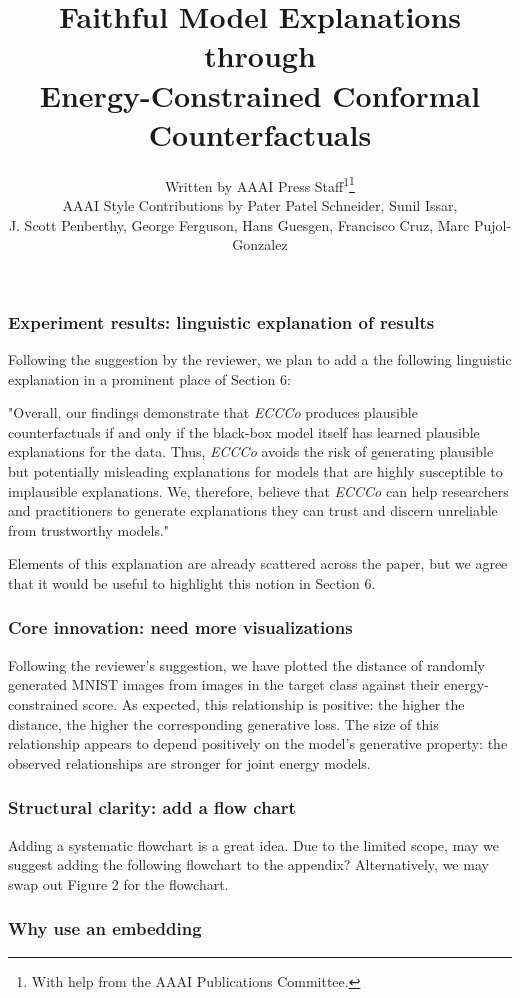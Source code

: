 \documentclass[letterpaper]{article} %
\title{Faithful Model Explanations through\\
Energy-Constrained Conformal Counterfactuals}
\author{
    Written by AAAI Press Staff\textsuperscript{\rm 1}\thanks{With help from the AAAI Publications Committee.}\\
    AAAI Style Contributions by Pater Patel Schneider,
    Sunil Issar,\\
    J. Scott Penberthy,
    George Ferguson,
    Hans Guesgen,
    Francisco Cruz\equalcontrib,
    Marc Pujol-Gonzalez\equalcontrib
}
\begin{document}
\subsubsection{Experiment results: linguistic explanation of results} 

Following the suggestion by the reviewer, we plan to add a the following linguistic explanation in a prominent place of Section 6: 

"Overall, our findings demonstrate that \textit{ECCCo} produces plausible counterfactuals if and only if the black-box model itself has learned plausible explanations for the data. Thus, \textit{ECCCo} avoids the risk of generating plausible but potentially misleading explanations for models that are highly susceptible to implausible explanations. We, therefore, believe that \textit{ECCCo} can help researchers and practitioners to generate explanations they can trust and discern unreliable from trustworthy models."

Elements of this explanation are already scattered across the paper, but we agree that it would be useful to highlight this notion in Section 6.

\subsubsection{Core innovation: need more visualizations} 

Following the reviewer's suggestion, we have plotted the distance of randomly generated MNIST images from images in the target class against their energy-constrained score. As expected, this relationship is positive: the higher the distance, the higher the corresponding generative loss. The size of this relationship appears to depend positively on the model's generative property: the observed relationships are stronger for joint energy models. 

\subsubsection{Structural clarity: add a flow chart} 

Adding a systematic flowchart is a great idea. Due to the limited scope, may we suggest adding the following flowchart to the appendix? Alternatively, we may swap out Figure 2 for the flowchart. 

\subsubsection{Why use an embedding}
\end{document}
